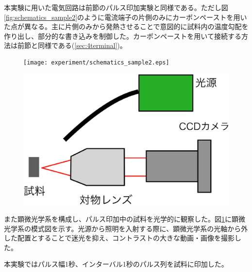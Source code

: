 本実験に用いた電気回路は前節のパルス印加実験と同様である。ただし図\ref{fig:schematics_sample2}のように電流端子の片側のみにカーボンペーストを用いた点が異なる。主に片側のみから発熱させることで意図的に試料内の温度勾配を作り出し、部分的な書き込みを制御した。カーボンペーストを用いて接続する方法は前節と同様である(\ref{sec:4terminal})。
\begin{figure}[!h]
 \begin{minipage}{0.4\hsize}
    \begin{center}
   \texttt{[image: experiment/schematics\_sample2.eps]}
  \end{center}
  \caption{}
  \label{fig:schematics_sample2}
   \end{minipage}
 \begin{minipage}{0.35\hsize}
    \begin{center}
   \includegraphics[width=\hsize]{experiment/microscope.eps}
  \end{center}
  \caption{}
  \label{fig:microscope}
   \end{minipage}
\end{figure}

また顕微光学系を構成し、パルス印加中の試料を光学的に観察した。図\ref{fig:microscope}に顕微光学系の模式図を示す。光源から照明を入射する際に、顕微光学系の光軸から外した配置とすることで迷光を抑え、コントラストの大きな動画・画像を撮影した。


本実験ではパルス幅1秒、インターバル1秒のパルス列を試料に印加した。


\clearpage

